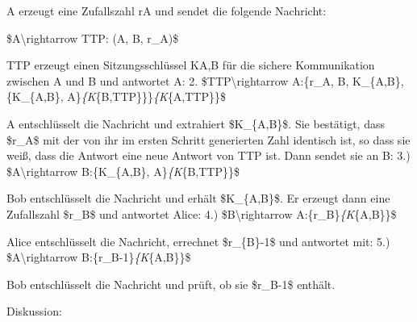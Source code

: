 \documentclass[a4paper]{article}
\begin{document}
\begin{multicols}{3}
\begin{itemize*}
            \begin{itemize*}
                  \item A erzeugt eine Zufallszahl rA und sendet die folgende Nachricht:
                  \begin{enumerate*} \def\labelenumi{\arabic{enumi}.} \item \$A\textbackslash rightarrow TTP: (A, B, r\_A)\$ \end{enumerate*}
                  \item TTP erzeugt einen Sitzungsschlüssel KA,B für die sichere Kommunikation zwischen A und B und antwortet A: 2. \$TTP\textbackslash rightarrow A:\{r\_A, B, K\_\{A,B\}, \{K\_\{A,B\}, A\}\emph{\{K}\{B,TTP\}\}\}\emph{\{K}\{A,TTP\}\}\$
                  \item A entschlüsselt die Nachricht und extrahiert \$K\_\{A,B\}\$. Sie bestätigt, dass \$r\_A\$ mit der von ihr im ersten Schritt generierten Zahl identisch ist, so dass sie weiß, dass die Antwort eine neue Antwort von TTP ist. Dann sendet sie an B: 3.) \$A\textbackslash rightarrow B:\{K\_\{A,B\}, A\}\emph{\{K}\{B,TTP\}\}\$
                  \item Bob entschlüsselt die Nachricht und erhält \$K\_\{A,B\}\$. Er erzeugt dann eine Zufallszahl \$r\_B\$ und antwortet Alice: 4.) \$B\textbackslash rightarrow A:\{r\_B\}\emph{\{K}\{A,B\}\}\$
                  \item Alice entschlüsselt die Nachricht, errechnet \$r\_\{B\}-1\$ und antwortet mit: 5.) \$A\textbackslash rightarrow B:\{r\_B-1\}\emph{\{K}\{A,B\}\}\$
                  \item Bob entschlüsselt die Nachricht und prüft, ob sie \$r\_B-1\$ enthält.
            \end{itemize*}
            \item
            Diskussion:


\end{itemize*}
\end{multicols}
\end{document}
